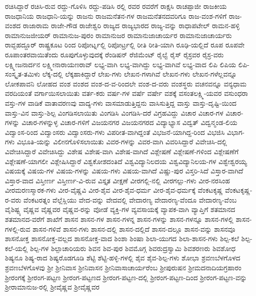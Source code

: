 {ರಚಿಸಿದ್ದಾರೆ
ರಚಿಸಿ-ರುವ
ರದ್ದು-ಗೊಳಿಸಿ
ರದ್ದು-ಪಡಿಸಿ
ರಲ್ಲಿ
ರವರ
ರವರೆಗೆ
ರಾಕ್ಷಸಿ
ರಾಚಪ್ಪಾಜೀ
ರಾಜಕೀಯ
ರಾಜಧಾನಿಯ
ರಾಜಧಾನಿ-ಯನ್ನು
ರಾಜನು
ರಾಜಮನೆತನ-ಗಳ
ರಾಜಮನೆತನದವರಿಗೂ
ರಾಜ-ವಂಶ-ಗಳಿಗೆ
ರಾಜ-ವಂಶದ
ರಾಜಾರಾಮ
ರಾಜೇ-ಗೌಡ
ರಾಜೇಶ್ವರಿ
ರಾಜ್ಯದ
ರಾಜ್ಯಭಾರದ
ರಾಜ್ಯ-ವನ್ನು
ರಾಧಾಪಟೇಲ್
ರಾಮನ-ಹಳ್ಳಿ
ರಾಮಾನುಜಜೀಯರ್
ರಾಮಾನುಜ-ಪುರಂ
ರಾಮಾನುಜರ
ರಾಮಾನುಜಾಚಾರ್ಯರ
ರಾಮಾನುಜಾಚಾರ್ಯರು
ರಾವ್ಬಹದ್ದೂರ್
ರಾಷ್ಟ್ರಕೂಟ
ರಿಂದ
ರಿಪೋರ್ಟ್ನಲ್ಲಿ
ರಿಪೋರ್ಟ್ರಲ್ಲಿ
ರೀತಿ
ರೀತಿ-ಯಾಗಿ
ರೂಢಿ-ಯಲ್ಲಿದೆ
ರೂಪ
ರೂಪವೇ
ರೂಪಾಂತರವಾಯಿತೆಂದು
ರೂಪುಗೊಳ್ಳುವುದಕ್ಕೆ
ರೆಂಡಿಷನ್
ರೆಜಿಮೆಂಟ್
ರೈಲ್ವೆ
ರೈಸ್
ರೈಸ್ರವರ
ರೈಸ್ರ-ವರು
ಲಕ್ಷ್ಮೀಜನಾರ್ದನ
ಲಕ್ಷ್ಮೀನಾರಾಯಣರಾವ್
ಲಭ್ಯ-ವಾಗಿ
ಲಭ್ಯ-ವಾಗಿದ್ದು
ಲಭ್ಯ-ವಾಗಿವೆ
ಲಭ್ಯ-ವಾದ
ಲಿಪಿ
ಲಿಪಿಯ
ಲಿಪಿ-ಸಂಸ್ಕೃತ-ತಮಿಳು
ಲೆಕ್ಕ-ದಲ್ಲಿ
ಲೆಕ್ಕಹಾಕಿದ್ದಾರೆ
ಲೇಖ-ಗಳು
ಲೇಖನ-ಗಳಾಗಿವೆ
ಲೇಖನ-ಗಳು
ಲೇಖನ-ಗಳೆಲ್ಲವನ್ನೂ
ಲೋಕಪಾವನಿ
ಲೋಹದ
ವಂಶ
ವಂಶದ
ವಂಶ-ದ-ವ-ರಿಂದಲೇ
ವಂಶ-ದ-ವರು
ವಂಶಸ್ಥರು
ವಚನವನ್ನೂ
ವನ್ಯಧಾಮ
ವರದಿಯಂತೆ
ವರ್ಗಾಯಿಸಲಾಯಿತು
ವರ್ತ-ಕರು
ವರ್ಷ-ಗಳ
ವರ್ಷೆ
ವರ್ಷೇ
ವಶಕ್ಕೆ
ವಸಂತಲಕ್ಷ್ಮಿ-ಯವರ
ವಸುಂಧರಾ
ವಸ್ತು-ಗಳ
ವಾಡಿಕೆ
ವಾತಾವರಣವು
ವಾದ್ಯ-ಗಳು
ವಾಸಮಾಡುತ್ತಿದ್ದನು
ವಾಸಿಸುತ್ತಿದ್ದ
ವಾಸ್ತು
ವಾಸ್ತು-ದೃಷ್ಟಿ-ಯಿಂದ
ವಾಸ್ತು-ವಿನ
ವಾಸ್ತು-ಶಿಲ್ಪ
ವಿಂಗಡಿಸಲಾಯಿತು
ವಿಂಗಡಿಸಿ
ವಿಂಗಡಿಸಿ-ದರೆ
ವಿಗ್ರಹವಿದ್ದು
ವಿಚಾರ
ವಿಚಾರ-ಗಳ
ವಿಚಾರ-ಗಳನ್ನು
ವಿಚಾರ-ಗಳನ್ನುಳ್ಳ
ವಿಚಾರ-ಗಳಿಗೆ
ವಿಜಯನಗರ
ವಿಜಯನಗರದ
ವಿದ್ಯಾಭ್ಯಾಸ
ವಿದ್ವತ್
ವಿದ್ವನ್ಮಂಡ-ಲಿಯ
ವಿದ್ವಾಂಸ-ರಿಂದ
ವಿದ್ವಾಂಸರು
ವಿದ್ವಾಂಸರು-ಗಳು
ವಿಪರೀತ-ವಾಗಿದ್ದಂತೆ
ವಿಭಜನೆ-ಯಾಗಿದ್ದ-ರಿಂದ
ವಿಭಜಿಸಿ
ವಿಭಾಗ-ಗಳು
ವಿಭೂತಿ-ಯನ್ನು
ವಿಲೀನಗೊಳಿಸಲಾಯಿತು
ವಿವರ-ಗಳನ್ನು
ವಿವರ-ವಾಗಿ
ವಿವರಿಸಿದ್ದಾರೆ
ವಿವೇಚಿಸಿ-ದಲ್ಲಿ
ವಿವೇಚಿಸಿದ್ದಾರೆ
ವಿವೇಚಿಸಿದ್ದು
ವಿಶೇಷ
ವಿಶೇಷ-ವಾಗಿ
ವಿಶೇಷ-ವಾಗಿದೆ
ವಿಶ್ಲೇಷಣೆ
ವಿಶ್ಲೇಷಣೆ-ಗಳಿಂದ
ವಿಶ್ಲೇಷಣೆಗೆ
ವಿಶ್ಲೇಷಣೆ-ಯಾಗಲೀ
ವಿಶ್ಲೇಷಿಸಿದ್ದಾರೆ
ವಿಶ್ವಕೋಶದಂತಿದೆ
ವಿಶ್ವವಿದ್ಯಾನಿಲದಯ
ವಿಶ್ವವಿದ್ಯಾನಿಲಯ-ಗಳ
ವಿಶ್ವೇಶ್ವರಯ್ಯ
ವಿಷಯಕ್ಕೆ
ವಿಷಯ-ಗಳ
ವಿಷಯ-ಗಳನ್ನು
ವಿಷಯ-ಗಳು
ವಿಷಯ-ವಾಗಿದೆ
ವಿಷ್ಣು-ಪುರ
ವಿಸ್ತರಿ-ಸಿದೆ
ವಿಸ್ತಾರ-ವಾಗಿದೆ
ವಿಸ್ತಾರ-ವಾದ
ವಿಸ್ತೀರ್ಣ
ವಿಸ್ತೀರ್ಣ-ವಿ-ರುವ
ವಿಸ್ತೃತ
ವೀಕ್ಷಣೆ
ವೀರಗಲ್ಲಿ-ನಲ್ಲಿ
ವೀರಗಲ್ಲು-ಗಳು
ವೀರ-ನರಸಿಂಹ
ವೀರಮರಣಸ್ಮಾರಕ-ಗಳು
ವೀರ-ವೈಷ್ಣವಿ
ವೀರ-ಶೈವ
ವೀರ-ಶೈವ-ಧರ್ಮ
ವೀರ-ಶೈವ-ಧರ್ಮಕ್ಕೆ
ವೆಂಕಟಕೃಷ್ಣ
ವೆಂಕಟಕೃಷ್ಣ-ರ-ವರು
ವೆಂಕಟರತ್ನಂ
ವೆಲ್ಲೆಸ್ಲಿಯು
ವೇದ-ವನ್ನು
ವೇದವಲ್ಲಿ
ವೇದಾರಣ್ಯ
ವೇದಾರಣ್ಯ-ವೆಂದೂ
ವೇದಾರಣ್ಯ-ವೆಂಬ
ವೈಶಿಷ್ಟ್ಯ
ವೈಷ್ಣವ
ವೈಷ್ಣವರ
ವೈಷ್ಣವ-ರನ್ನು
ವೋಡೆ
ವ್ಯಕ್ತಿ-ಗಳ
ವ್ಯವಸಾಯಕ್ಕೆ
ವ್ಯಾಪಕ-ವಾಗಿ
ವ್ಯಾಪ್ತಿಗೆ
ಶತಮಾನದ
ಶತಮಾನದ-ವರೆಗೆ
ಶಾಖೆಗೆ
ಶಾಸನ
ಶಾಸನ-ಗಳ
ಶಾಸನ-ಗಳನ್ನ
ಶಾಸನ-ಗಳನ್ನು
ಶಾಸನ-ಗಳನ್ನೂ
ಶಾಸನ-ಗಳಲ್ಲಿ
ಶಾಸನ-ಗಳಲ್ಲಿ-ರುವ
ಶಾಸನ-ಗಳಿವೆ
ಶಾಸನ-ಗಳು
ಶಾಸನ-ದಲ್ಲಿ
ಶಾಸನ-ದಲ್ಲಿದೆ
ಶಾಸನ-ದಲ್ಲೂ
ಶಾಸನ-ವನ್ನು
ಶಾಸನವೂ
ಶಾಸನೋಕ್ತ
ಶಾಸನೋಕ್ತ-ವಲ್ಲದ
ಶಾಸನೋಕ್ತ-ವಾದ
ಶಿಂಶಾ
ಶಿಂಷಾ
ಶಿಲಾ-ಯುಗದ
ಶಿಲಾ-ಶಾಸನ-ಗಳು
ಶಿಲ್ಪ-ಕಲೆ
ಶಿಲ್ಪ-ಕಲೆ-ಯಲ್ಲಿ
ಶಿಲ್ಪ-ಗಳ
ಶಿಲ್ಪಾಚಾರಿಯರು
ಶಿವನ
ಶಿವ-ಪುರ
ಶಿವಮೊಗ್ಗ
ಶಿವರುದ್ರಸ್ವಾಮಿ
ಶಿವಶರಣರು
ಶಿವಶೋಧ
ಶಿಷ್ಯನೂ
ಶಿಷ್ಯ-ರಾದ
ಶಿಷ್ಯರೊಡಗೂಡಿ
ಶೆಟ್ಟಿ
ಶೆಟ್ಟಿ-ಹಳ್ಳಿ-ಗಳಲ್ಲಿ
ಶೈವ
ಶೈವ-ಶಿಲ್ಪ-ಗಳು
ಶೋಭಾ
ಶ್ರವಣಬೆಳಗೊಳದ
ಶ್ರವಣಬೆಳಗೊಳವು
ಶ್ರೀ
ಶ್ರೀನಿವಾಸ
ಶ್ರೀನಿವಾಸನ
ಶ್ರೀನಿವಾಸಾಚಾರ್ಯರೆಂಬ
ಶ್ರೀಪುರುಷನ
ಶ್ರೀಮದನಾದಿಯಗ್ರಹಾರಂ
ಶ್ರೀರಂಗಕ್ಕೆ
ಶ್ರೀರಂಗ-ಪಟ್ಟಣ
ಶ್ರೀರಂಗ-ಪಟ್ಟಣದ
ಶ್ರೀರಂಗ-ಪಟ್ಟಣ-ದಲ್ಲಿ
ಶ್ರೀರಂಗ-ಪಟ್ಟಣ-ದಿಂದ
ಶ್ರೀರಂಗ-ಪಟ್ಟಣ-ವನ್ನು
ಶ್ರೀರಾಮಾನುಜ-ರಲ್ಲಿ
ಶ್ರೀವೈಷ್ಣವ
ಶ್ರೀವೈಷ್ಣವರ
}
